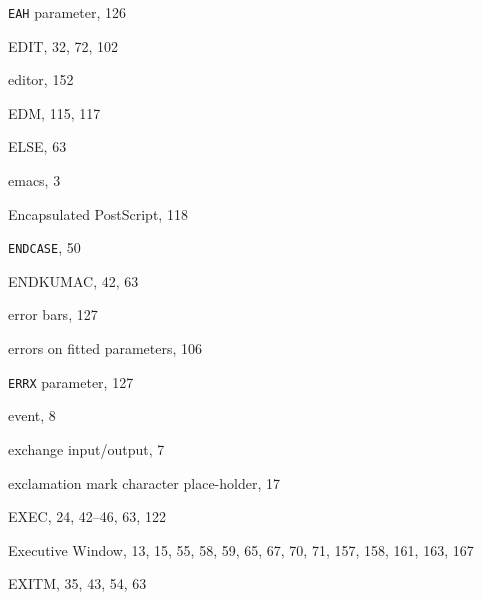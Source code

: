 \begin{theindex}
  \item {\tt EAH}
     parameter, 126
  \item {\ttfamily  EDIT}, 32, 72, 102
  \item editor, 152
  \item {\ttfamily  EDM}, 115, 117
  \item {\ttfamily  ELSE}, 63
  \item emacs, 3
  \item Encapsulated PostScript, 118
  \item {\tt ENDCASE}, 50
  \item {\ttfamily  ENDKUMAC}, 42, 63
  \item error
    \subitem bars, 127
  \item errors on fitted parameters, 106
  \item {\tt ERRX}
     parameter, 127
  \item event, 8
  \item exchange input/output, 7
  \item exclamation mark character
    \subitem place-holder, 17
  \item {\ttfamily  EXEC}, 24, 42--46, 63, 122
  \item Executive Window, 13, 15, 55, 58, 59, 65, 67, 70, 71, 157, 158, 
		161, 163, 167
  \item {\ttfamily  EXITM}, 35, 43, 54, 63

  \indexspace


\end{theindex}
